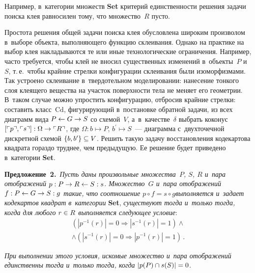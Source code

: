 \begin{multicols}{2}
   Например, в~категории множеств \textbf{Set} критерий единственности решения 
задачи поиска клея равносилен тому, что множество~$R$ пусто.
   
   Простота решения общей задачи поиска клея обусловлена широким 
произволом в~выборе объекта, выполняющего функцию склеивания. Однако на 
практике на выбор клея накладываются те или иные технологические 
ограничения. Например, часто требуется, чтобы клей не вносил существенных 
изменений в~объекты~$P$ и~$S$, т.\,е.\ чтобы крайние стрелки конфигурации 
склеивания были изоморфизмами. Так устроено склеивание в~твер\-до\-тель\-ном 
моделировании: нанесение тонкого слоя клеящего вещества на участок 
по\-верх\-ности тела не меняет его геометрии. В~таком случае можно упрос\-тить 
конфигурацию, отбросив крайние стрелки: составить класс~$\mathrm{Cd}$, 
фигурирующий в~постановке обратной задачи, из всех диаграмм вида 
$P\hm\leftarrow G\hm\to S$ со схемой~$V$, а~в~качестве~$\delta$ выбрать 
коконус $[\ulcorner p\urcorner, \ulcorner s\urcorner] : \Omega\hm\to  \ulcorner 
R\urcorner$, где $\Omega : b\mapsto P$, $b^\prime\mapsto S$~--- диаграмма 
с~двухточечной дискретной схемой $\{b, b^\prime\} \hm\subseteq V$. Решить 
такую задачу вос\-ста\-нов\-ле\-ния кодекартова квадрата гораздо труднее, чем 
предыдущую. Ее решение будет приведено в~категории \textbf{Set}.
   
   \smallskip
   
   \noindent
   \textbf{Предложение~2.}\ \textit{Пусть даны произвольные множества~$P$, 
$S$, $R$ и~пара отображений $p : P \hm\to R \hm\leftarrow S : s$. 
Множество~$G$ и~пара отображений $f : P \hm\leftarrow G \hm\to S : g$ такие, 
что соотношение $p\circ f = s \circ g$\linebreak выполняется и~задает кодекартов квадрат 
в~категории} \textbf{Set}, \textit{существуют тогда и~только тогда, когда для любого $r\hm\in 
R$ выполняется следующее условие}:
  \begin{multline*}
   \left( \left\vert p^{-1}(r)\right\vert  = 0 \Rightarrow \left\vert s^{-1}(r)\right\vert  
= 1\right) \wedge\\
\wedge \left(\left\vert s^{-1}(r)\right\vert  =
 0 \Rightarrow \left\vert p^{-
1}(r)\right\vert  = 1\right)\,.
\end{multline*}
   
   \textit{При выполнении этого условия, искомые множество и~пара 
отображений единственны тогда и~только тогда, когда} $\left\vert p(P) \cap 
s(S)\right\vert \hm= 0$.
   
   \smallskip
   

\end{multicols}
